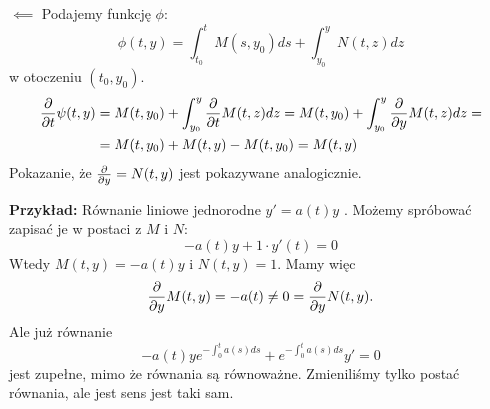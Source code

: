 $\impliedby$ Podajemy funkcję $\phi$:
$$\phi(t, y)=\int_{t_0}^t M(s, y_0)ds+\int_{y_0}^y N(t, z)dz$$
w otoczeniu $(t_0, y_0)$. 
\begin{align*}
    {\partial\over\partial t}\psi(t, y)&=M(t, y_0)+\int_{y_0}^y{\partial\over\partial t}M(t, z)dz=M(t, y_0)+\int_{y_0}^y{\partial\over\partial y}M(t, z)dz=\\
    &=M(t, y_0)+M(t, y)-M(t, y_0)=M(t, y)
\end{align*}
Pokazanie, że ${\partial\over\partial y}=N(t, y)$ jest pokazywane analogicznie.
\medskip

\textbf{Przykład:} Równanie liniowe jednorodne $y'=a(t)y$ . Możemy spróbować zapisać je w postaci z $M$ i $N$:
$$-a(t)y+1\cdot y'(t)=0$$
Wtedy $M(t, y)=-a(t)y$ i $N(t, y)=1$. Mamy więc
$${\partial\over\partial y}M(t, y)=-a(t)\neq0={\partial\over\partial y}N(t, y).$$
Ale już równanie 
$$-a(t)ye^{-\int_0^ta(s)ds}+e^{-\int_0^ta(s)ds}y'=0$$
jest zupełne, mimo że równania są równoważne. Zmieniliśmy tylko postać równania, ale jest sens jest taki sam.